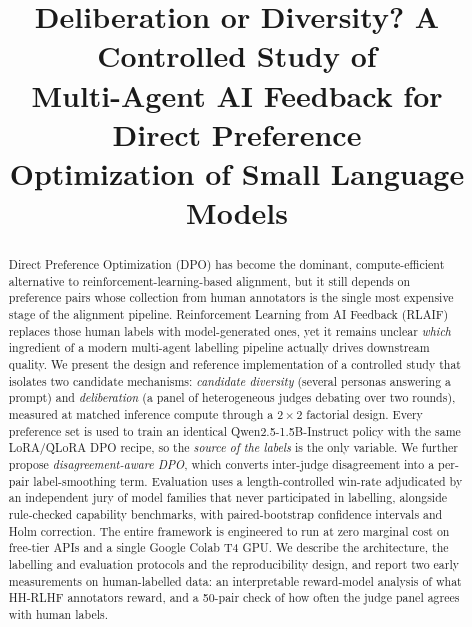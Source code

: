 \documentclass[conference]{IEEEtran}
\begin{document}
\title{Deliberation or Diversity? A Controlled Study of\\
Multi-Agent AI Feedback for Direct Preference\\
Optimization of Small Language Models}

\author{
}

\maketitle

\begin{abstract}
Direct Preference Optimization (DPO) has become the dominant, compute-efficient
alternative to reinforcement-learning-based alignment, but it still depends on
preference pairs whose collection from human annotators is the single most
expensive stage of the alignment pipeline. Reinforcement Learning from AI
Feedback (RLAIF) replaces those human labels with model-generated ones, yet it
remains unclear \emph{which} ingredient of a modern multi-agent labelling
pipeline actually drives downstream quality. We present the design and reference
implementation of a controlled study that isolates two candidate mechanisms:
\textit{candidate diversity} (several personas answering a prompt) and
\textit{deliberation} (a panel of heterogeneous judges debating over two rounds),
measured at matched inference compute through a $2{\times}2$ factorial design.
Every preference set is used to train an identical Qwen2.5-1.5B-Instruct policy
with the same LoRA/QLoRA DPO recipe, so the \emph{source of the labels} is the
only variable. We further propose \emph{disagreement-aware DPO}, which converts
inter-judge disagreement into a per-pair label-smoothing term. Evaluation uses a
length-controlled win-rate adjudicated by an independent jury of model families
that never participated in labelling, alongside rule-checked capability
benchmarks, with paired-bootstrap confidence intervals and Holm correction. The
entire framework is engineered to run at zero marginal cost on free-tier APIs and
a single Google Colab T4 GPU. We describe the architecture, the labelling and
evaluation protocols and the reproducibility design, and report two early
measurements on human-labelled data: an interpretable reward-model analysis of
what HH-RLHF annotators reward, and a 50-pair check of how often the judge panel
agrees with human labels.
\end{abstract}
\end{document}
